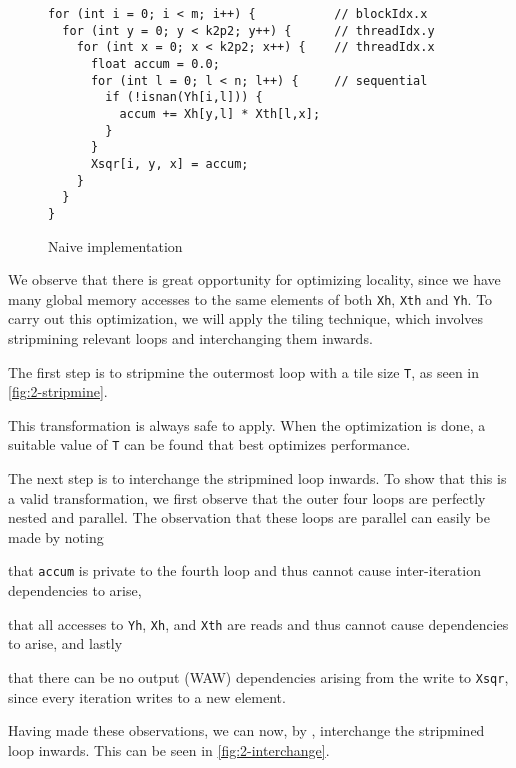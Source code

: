 \begin{figure}[H]
  \centering
\begin{verbatim}
for (int i = 0; i < m; i++) {           // blockIdx.x
  for (int y = 0; y < k2p2; y++) {      // threadIdx.y
    for (int x = 0; x < k2p2; x++) {    // threadIdx.x
      float accum = 0.0;
      for (int l = 0; l < n; l++) {     // sequential
        if (!isnan(Yh[i,l])) {
          accum += Xh[y,l] * Xth[l,x];
        }
      }
      Xsqr[i, y, x] = accum;
    }
  }
}
\end{verbatim}
\caption{Naive implementation}
\label{fig:2-naive}
\end{figure}
We observe that there is great opportunity for optimizing locality, since we
have many global memory accesses to the same elements of both \texttt{Xh},
\texttt{Xth} and \texttt{Yh}. %
To carry out this optimization, we will apply the tiling technique, which
involves stripmining relevant loops and interchanging them inwards.

The first step is to stripmine the outermost loop with a tile size \texttt{T},
as seen in \autoref{fig:2-stripmine}.

This transformation is always safe to apply. When the optimization is done, a
suitable value of \texttt{T} can be found that best optimizes performance.

The next step is to interchange the stripmined loop inwards.
To show that this is a valid transformation, we first observe that the outer
four loops are perfectly nested and parallel.
The observation that these loops are parallel can easily be made by noting
\begin{enumerate*}[label=(\alph*)]
\item
  that \texttt{accum} is private to the fourth loop and thus cannot cause
  inter-iteration dependencies to arise,
\item
  that all accesses to \texttt{Yh}, \texttt{Xh}, and \texttt{Xth} are reads and
  thus cannot cause dependencies to arise, and lastly
\item
  that there can be no output (WAW) dependencies arising from the write to
  \texttt{Xsqr}, since every iteration writes to a new element.
\end{enumerate*}
Having made these observations, we can now, by \cite[corollary 2]{pmph},
interchange the stripmined loop inwards.
This can be seen in \autoref{fig:2-interchange}.

